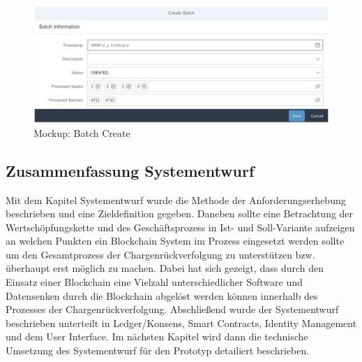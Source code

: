 \begin{figure}[H]
	\centering
	\includegraphics[width=1\linewidth]{pictures/ui-create-batch}
	\caption[Mockup: Batch Create]{Mockup: Batch Create}
	\label{fig:ui-create-batch}
\end{figure}




\subsection{Zusammenfassung Systementwurf}

Mit dem Kapitel Systementwurf wurde die Methode der Anforderungserhebung beschrieben und eine Zieldefinition gegeben. Daneben sollte eine Betrachtung der Wertschöpfungskette und des Geschäftsprozess in Ist- und Soll-Variante aufzeigen an welchen Punkten ein Blockchain System im Prozess eingesetzt werden sollte um den Gesamtprozess der Chargenrückverfolgung zu unterstützen bzw. überhaupt erst möglich zu machen. Dabei hat sich gezeigt, dass durch den Einsatz einer Blockchain eine Vielzahl unterschiedlicher Software und Datensenken durch die Blockchain abgelöst werden können innerhalb des Prozesses der Chargenrückverfolgung. Abschließend wurde der Systementwurf beschrieben unterteilt in Ledger/Konsens, Smart Contracts, Identity Management und dem User Interface. Im nächsten Kapitel wird dann die technische Umsetzung des Systementwurf für den Prototyp detailiert beschrieben.

\newpage
